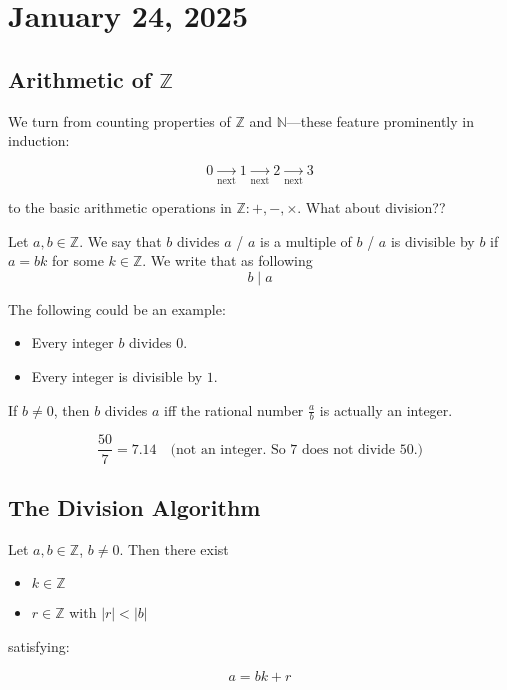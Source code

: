 \documentclass[11pt, draft]{article}
\begin{document}
\section{January 24, 2025}

\subsection{Arithmetic of \(\mathbb{Z}\)}

We turn from counting properties of \(\mathbb{Z}\) and \(\mathbb{N}\)—these
feature prominently in induction:

\[
    0 \underset{\text{next}}{\rightarrow} 1 \underset{\text{next}}{\rightarrow} 2 \underset{\text{next}}{\rightarrow} 3
\]

to the basic arithmetic operations in \(\mathbb{Z}: +, -, \times\). What about
division??

\begin{definition}
    Let \(a, b \in \mathbb{Z}\). We say that \(b\) divides \(a\) / \(a\) is a multiple of \(b\) / \(a\) is divisible by \(b\) if \(a = bk\) for some \(k \in \mathbb{Z}\). We
    write that as following
    \[ b \mid a\]
\end{definition}

\begin{example}
    The following could be an example:
    \begin{itemize}
        \item Every integer \(b\) divides \(0\).
        \item Every integer is divisible by \(1\).
    \end{itemize}
\end{example}

\begin{fact}
    If \(b \neq 0\), then \(b\) divides \(a\) iff the rational number \(\frac{a}{b}\) is actually an integer.
\end{fact}
\begin{example}
    \[
        \frac{50}{7} = 7.14 \quad \text{(not an integer. So 7 does not divide 50.)}
    \]

\end{example}

\subsection{The Division Algorithm}
\begin{theorem}

    Let \(a, b \in \mathbb{Z}\), \(b \neq 0\). Then there exist
    \begin{itemize}
        \item \(k \in \mathbb{Z}\)
        \item \(r \in \mathbb{Z}\) with \(|r| < |b|\)
    \end{itemize}
    satisfying:

    \[ a = bk + r \]

\end{theorem}
\end{document}
